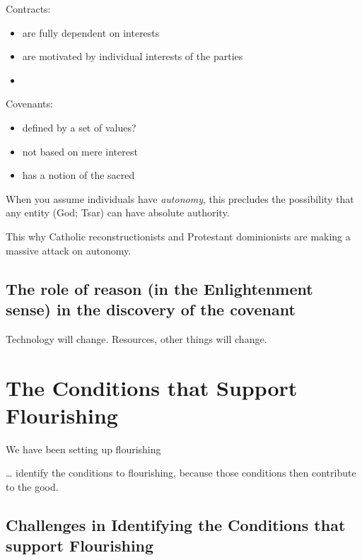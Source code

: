 \documentclass[
]{book}
\providecommand{\tightlist}{%
  \setlength{\itemsep}{0pt}\setlength{\parskip}{0pt}}
\begin{document}
Contracts:

\begin{itemize}
\tightlist
\item
  are fully dependent on interests
\item
  are motivated by individual interests of the parties
\item
\end{itemize}

Covenants:

\begin{itemize}
\item
  defined by a set of values?
\item
  not based on mere interest
\item
  has a notion of the sacred
\end{itemize}

When you assume individuals have \emph{autonomy}, this precludes the
possibility that any entity (God; Tsar) can have absolute authority.

This why Catholic reconstructionists and Protestant dominionists are making a massive attack on autonomy.

\hypertarget{the-role-of-reason-in-the-enlightenment-sense-in-the-discovery-of-the-covenant}{%
\section{The role of reason (in the Enlightenment sense) in the discovery of the covenant}\label{the-role-of-reason-in-the-enlightenment-sense-in-the-discovery-of-the-covenant}}

Technology will change. Resources, other things will change.

\hypertarget{the-conditions-that-support-flourishing}{%
\chapter{The Conditions that Support Flourishing}\label{the-conditions-that-support-flourishing}}

We have been setting up flourishing

\ldots{} identify the conditions to flourishing, because those conditions then contribute to the good.

\hypertarget{challenges-in-identifying-the-conditions-that-support-flourishing}{%
\section{Challenges in Identifying the Conditions that support Flourishing}\label{challenges-in-identifying-the-conditions-that-support-flourishing}}
\end{document}
